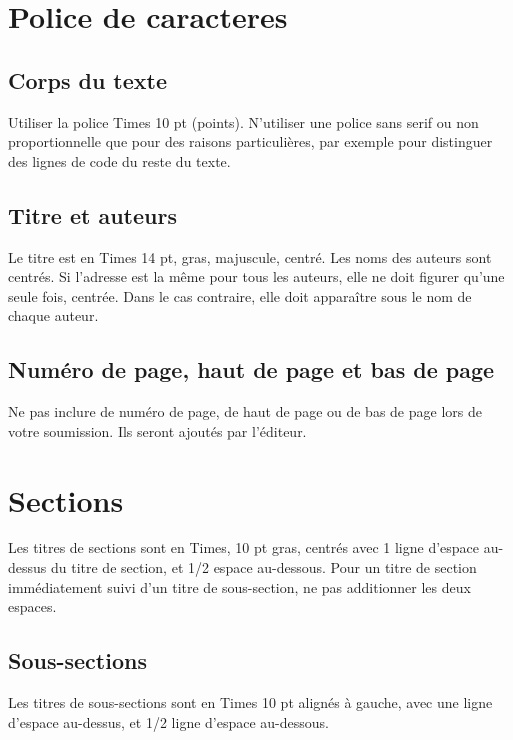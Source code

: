 \documentclass{article}
\begin{document}
\section{Police de caracteres}\label{sec:typeset_text}

\subsection{Corps du texte}\label{subsec:body}

Utiliser la police Times 10 pt (points). N'utiliser une police sans serif ou non proportionnelle que pour des raisons particulières, par exemple pour distinguer des lignes de code du reste du texte.

\subsection{Titre et auteurs}

Le titre est en Times 14 pt, gras, majuscule, centré. Les noms des auteurs sont centrés. Si l'adresse est la même pour tous les auteurs, elle ne doit figurer qu'une seule fois, centrée. Dans le cas contraire, elle doit apparaître sous le nom de chaque auteur.

\subsection{Numéro de page, haut de page et  bas de page}

Ne pas inclure  de numéro de page, de haut de page ou de bas de page lors de votre soumission. Ils seront ajoutés par l'éditeur.

\section{Sections}

Les titres de sections sont en Times, 10 pt gras, centrés avec 1 ligne d'espace au-dessus du titre de section, et 1/2 espace au-dessous. Pour un titre de section immédiatement suivi d'un titre de sous-section, ne pas additionner les deux espaces.

\subsection{Sous-sections}

Les titres de sous-sections sont en Times 10 pt alignés à gauche, avec une ligne d'espace au-dessus, et 1/2 ligne d'espace au-dessous.
\end{document}
